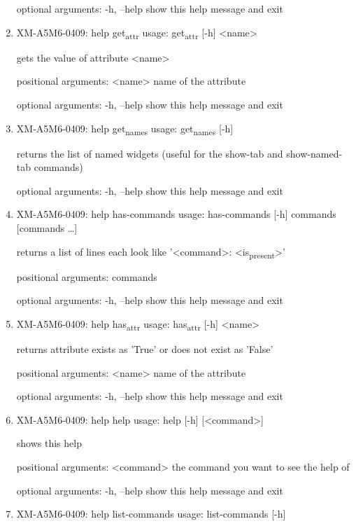 \documentclass[11pt]{article}
\begin{document}
\begin{enumerate}
optional arguments:
  -h, --help  show this help message and exit

\item XM-A5M6-0409: help get\textsubscript{attr}
\label{sec:org1b751a0}
usage: get\textsubscript{attr} [-h] <name>

gets the value of attribute <name>

positional arguments:
  <name>      name of the attribute

optional arguments:
  -h, --help  show this help message and exit

\item XM-A5M6-0409: help get\textsubscript{names}
\label{sec:orgafe0fb5}
usage: get\textsubscript{names} [-h]

returns the list of named widgets (useful for the show-tab and show-named-tab
commands)

optional arguments:
  -h, --help  show this help message and exit

\item XM-A5M6-0409: help has-commands
\label{sec:org9f1c731}
usage: has-commands [-h] commands [commands \ldots{}]

returns a list of lines each look like '<command>: <is\textsubscript{present}>'

positional arguments:
  commands

optional arguments:
  -h, --help  show this help message and exit

\item XM-A5M6-0409: help has\textsubscript{attr}
\label{sec:orgcfb81fe}
usage: has\textsubscript{attr} [-h] <name>

returns attribute exists as 'True' or does not exist as 'False'

positional arguments:
  <name>      name of the attribute

optional arguments:
  -h, --help  show this help message and exit

\item XM-A5M6-0409: help help
\label{sec:orgcff0113}
usage: help [-h] [<command>]

shows this help

positional arguments:
  <command>   the command you want to see the help of

optional arguments:
  -h, --help  show this help message and exit

\item XM-A5M6-0409: help list-commands
\label{sec:orgaa8cf66}
usage: list-commands [-h]


\end{enumerate}
\end{document}
